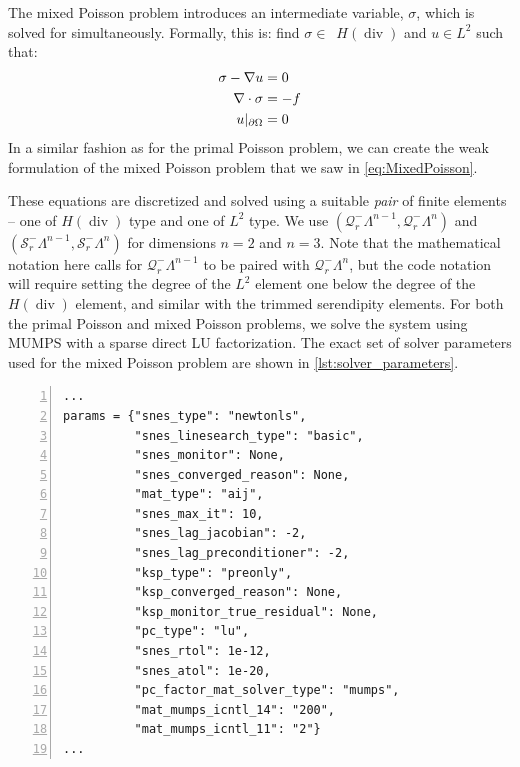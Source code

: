 \documentclass[format=acmsmall,screen,timestamp=false,a4paper]{acmart}
\DeclareMathOperator{\Div}{div}
\newcommand{\calQ}{\mathcal{Q}}
\newcommand{\calS}{\mathcal{S}}
\newcommand{\hdiv}{\ensuremath{{H}(\Div)}\xspace}
\begin{document}
The mixed Poisson problem introduces an intermediate variable, $\sigma$, which is solved for simultaneously.
Formally, this is: find $\sigma\in$~\hdiv and $u\in L^2$ such that:
\begin{align}
     \sigma - \nabla u &= 0 \notag \\
     \nabla \cdot \sigma &= -f \notag \\
     u\vert_{\partial \Omega} &= 0 \notag
\end{align}
In a similar fashion as for the primal Poisson problem, we can create the weak formulation of the mixed Poisson problem that we saw in \cref{eq:MixedPoisson}.

These equations are discretized and solved using a suitable \textit{pair} of finite elements -- one of \hdiv type and one of $L^2$ type.  We use $(\calQ_r^-\Lambda^{n-1},\calQ_r^-\Lambda^n)$ and $(\calS_r^-\Lambda^{n-1},\calS_r^-\Lambda^n)$ for dimensions $n=2$ and $n=3$.  Note that the mathematical notation here calls for $\mathcal{Q}^-_r \Lambda^{n-1}$ to be paired with $\mathcal{Q}^-_r \Lambda^n$, but the code notation will require setting the degree of the $L^2$ element one below the degree of the \hdiv element, and similar with the trimmed serendipity elements.
For both the primal Poisson and mixed Poisson problems, we solve the system using MUMPS with a sparse direct LU factorization.
The exact set of solver parameters used for the mixed Poisson problem are shown in \cref{lst:solver_parameters}.

\begin{lstlisting}[float=htbp,caption={An example of some solver parameters that we can use for the mixed Poisson problem.  The options presented here solve the algebraic system with a simplified Newton method where the Jacobian is held constant at the first iterate.  Therefore it is factored at the beginning and triangular solves are applied to it at each subsequent iteration.  This has the effect of performing iterative refinement \cite{wilkinson1994rounding,moler1967iterative} and yields an increased algebraic accuracy on fine meshes.}, label={lst:solver_parameters}, numbers=left, firstnumber=1, xleftmargin=20pt,  xrightmargin=20pt]
...
params = {"snes_type": "newtonls",
          "snes_linesearch_type": "basic",
          "snes_monitor": None,
          "snes_converged_reason": None,
          "mat_type": "aij",
          "snes_max_it": 10,
          "snes_lag_jacobian": -2,
          "snes_lag_preconditioner": -2,
          "ksp_type": "preonly",
          "ksp_converged_reason": None,
          "ksp_monitor_true_residual": None,
          "pc_type": "lu",
          "snes_rtol": 1e-12,
          "snes_atol": 1e-20,
          "pc_factor_mat_solver_type": "mumps",
          "mat_mumps_icntl_14": "200",
          "mat_mumps_icntl_11": "2"}
...
\end{lstlisting}
\end{document}
